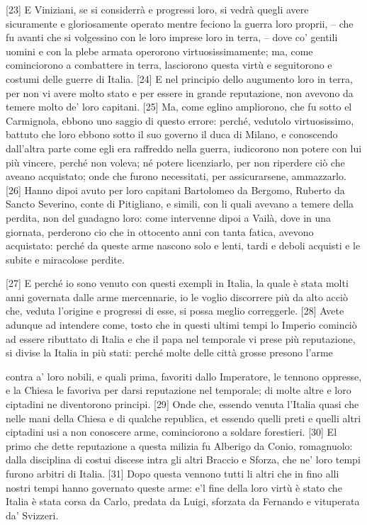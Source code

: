 {[}23{]} E Viniziani, se si considerrà e progressi loro, si vedrà quegli
avere sicuramente e gloriosamente operato mentre feciono la guerra loro
proprii, -- che fu avanti che si volgessino con le loro imprese loro in
terra, -- dove co' gentili uomini e con la plebe armata operorono
virtuosissimamente; ma, come cominciorono a combattere in terra,
lasciorono questa virtù e seguitorono e costumi delle guerre di Italia.
{[}24{]} E nel principio dello augumento loro in terra, per non vi avere
molto stato e per essere in grande reputazione, non avevono da temere
molto de' loro capitani. {[}25{]} Ma, come eglino ampliorono, che fu
sotto el Carmignola, ebbono uno saggio di questo errore: perché,
vedutolo virtuosissimo, battuto che loro ebbono sotto il suo governo il
duca di Milano, e conoscendo dall'altra parte come egli era raffreddo
nella guerra, iudicorono non potere con lui più vincere, perché non
voleva; né potere licenziarlo, per non riperdere ciò che aveano
acquistato; onde che furono necessitati, per assicurarsene, ammazzarlo.
{[}26{]} Hanno dipoi avuto per loro capitani Bartolomeo da Bergomo,
Ruberto da Sancto Severino, conte di Pitigliano, e simili, con li quali
avevano a temere della perdita, non del guadagno loro: come intervenne
dipoi a Vailà, dove in una giornata, perderono cio che in ottocento anni
con tanta fatica, avevono acquistato: perché da queste arme nascono solo
e lenti, tardi e deboli acquisti e le subite e miracolose perdite.

{[}27{]} E perché io sono venuto con questi exempli in Italia, la quale
è stata molti anni governata dalle arme mercennarie, io le voglio
discorrere più da alto acciò che, veduta l'origine e progressi di esse,
si possa meglio correggerle. {[}28{]} Avete adunque ad intendere come,
tosto che in questi ultimi tempi lo Imperio cominciò ad essere ributtato
di Italia e che il papa nel temporale vi prese più reputazione, si
divise la Italia in più stati: perché molte delle città grosse presono l'arme \linebreak

\quebra

\noindent{}contra a' loro nobili, e quali prima, favoriti dallo Imperatore,
le tennono oppresse, e la Chiesa le favoriva per darsi reputazione nel
temporale; di molte altre e loro ciptadini ne diventorono principi.
{[}29{]} Onde che, essendo venuta l'Italia quasi che nelle mani della
Chiesa e di qualche republica, et essendo quelli preti e quelli altri
ciptadini usi a non conoscere arme, cominciorono a soldare forestieri.
{[}30{]} El primo che dette reputazione a questa milizia fu Alberigo da
Conio, romagnuolo: dalla disciplina di costui discese intra gli altri
Braccio e Sforza, che ne' loro tempi furono arbitri di Italia. {[}31{]}
Dopo questa vennono tutti li altri che in fino alli nostri tempi hanno
governato queste arme: e'l fine della loro virtù è stato che Italia è
stata corsa da Carlo, predata da Luigi, sforzata da Fernando e
vituperata da' Svizzeri.

